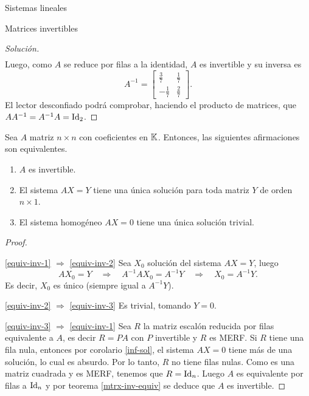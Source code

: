 \begin{chapter}{Sistemas lineales}
\begin{section}{Matrices invertibles}
\begin{proof}[Solución]
\begin{align*}
                \end{align*}
                Luego, como $A$ se reduce por filas a la identidad, $A$ es invertible y su inversa es  
                \begin{equation*}
                A^{-1}=\begin{bmatrix}\frac37&\frac17\\-\frac17&\frac27 \end{bmatrix}.
                \end{equation*}
                El lector desconfiado  podrá comprobar, haciendo el producto de matrices, que $AA^{-1} = A^{-1}A=\operatorname{Id}_2$.
            \end{proof}
            
            
            \begin{teorema}\label{mtrx-inv-equiv2} 
                Sea $A$ matriz $n \times n$ con coeficientes en $\mathbb K$. Entonces,  las siguientes afirmaciones son equivalentes. 
                \begin{enumerate}[label=\textit{\roman*)}, ref=\textit{\roman*)}]
                    \item\label{equiv-inv-1} $A$ es invertible.
                    \item\label{equiv-inv-2} El sistema $AX=Y$ tiene una única solución para toda matriz $Y$ de orden $n \times 1$. 
                    \item\label{equiv-inv-3} El sistema homogéneo $AX=0$ tiene una única solución trivial.
                \end{enumerate}
            \end{teorema}
            \begin{proof}

                \

                \ref{equiv-inv-1} $\Rightarrow$  \ref{equiv-inv-2} Sea $X_0$ solución del sistema $AX=Y$, luego
                \begin{equation*}
                AX_0=Y  \quad \Rightarrow \quad  A^{-1}AX_0 = A^{-1}Y  \quad \Rightarrow \quad  X_0 = A^{-1}Y.
                \end{equation*}
                Es decir, $X_0$ es único (siempre igual  a $A^{-1}Y$).  
                
                \ref{equiv-inv-2} $\Rightarrow$  \ref{equiv-inv-3} Es trivial, tomando $Y =0$.
                
                \ref{equiv-inv-3} $\Rightarrow$  \ref{equiv-inv-1} Sea $R$ la matriz escalón reducida por filas equivalente a $A$, es decir $R=PA$ con $P$ invertible y $R$ es MERF. Si $R$ tiene una fila nula, entonces por corolario  \ref{inf-sol},  el sistema $AX =0$ tiene más de una solución, lo cual es absurdo.  Por lo tanto, $R$ no tiene filas nulas. Como es una matriz cuadrada y es MERF, tenemos que $R=\operatorname{Id}_n$. Luego $A$ es equivalente por filas a $\operatorname{Id}_n$ y por teorema \ref{mtrx-inv-equiv} se deduce que $A$ es invertible. 			
                

\end{proof}
\end{section}
\end{chapter}
